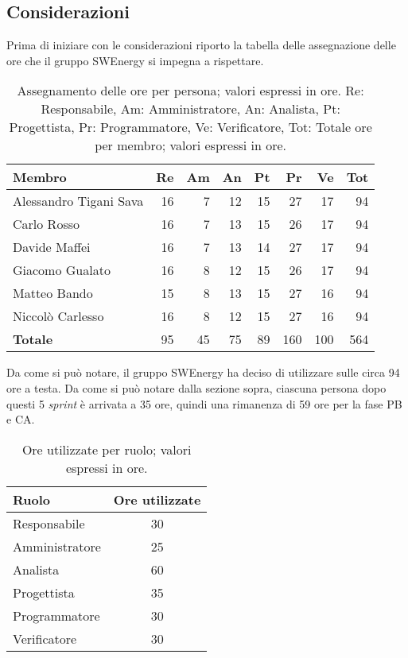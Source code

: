 \subsection{Considerazioni}
Prima di iniziare con le considerazioni riporto la tabella delle assegnazione 
delle ore che il gruppo SWEnergy si impegna a rispettare.

\begin{table}[H]
	\renewcommand{\arraystretch}{1.5}
	\centering
	\begin{tabular}{l|r|r|r|r|r|r|r}
		\textbf{Membro} & \textbf{Re} & \textbf{Am} & \textbf{An} & \textbf{Pt}
		& \textbf{Pr} & \textbf{Ve} & \textbf{Tot} \\
		\hline
		Alessandro Tigani Sava 	&	16 &  7 & 12 & 15 &  27 &  17 &  94 \\
		Carlo Rosso 			&	16 &  7 & 13 & 15 &  26 &  17 &  94 \\
		Davide Maffei			&	16 &  7 & 13 & 14 &  27 &  17 &  94 \\
		Giacomo Gualato 		&	16 &  8 & 12 & 15 &  26 &  17 &  94 \\
		Matteo Bando 			&	15 &  8 & 13 & 15 &  27 &  16 &  94	\\
		Niccolò Carlesso 		&	16 &  8 & 12 & 15 &  27 &  16 &  94 \\
		\hline
		\textbf{Totale} 		&	95 & 45 & 75 & 89 & 160 & 100 & 564 \\
	\end{tabular}

	\caption{Assegnamento delle ore per persona; valori espressi in ore.
		Re: Responsabile, Am: Amministratore, An: Analista, Pt:
	Progettista, Pr: Programmatore, Ve: Verificatore, Tot: Totale ore per 
	membro; valori espressi in ore.}
\end{table}

Da come si può notare, il gruppo SWEnergy ha deciso di utilizzare sulle circa 
94 ore a testa. Da come si può notare dalla sezione sopra, ciascuna persona dopo 
questi 5 \textit{sprint} è arrivata a 35 ore, quindi una rimanenza di 59 ore per la fase PB e CA.


\begin{table}[H]
	\centering
	\begin{tabular}{l|c}
		\textbf{Ruolo}         & \textbf{Ore utilizzate} \\
		\hline
		Responsabile            & 30            \\
		Amministratore          & 25            \\
		Analista                & 60            \\
		Progettista             & 35            \\
		Programmatore           & 30            \\
		Verificatore            & 30            \\
		\hline
	\end{tabular}
	\caption{Ore utilizzate per ruolo; valori espressi in ore.}  
\end{table}

